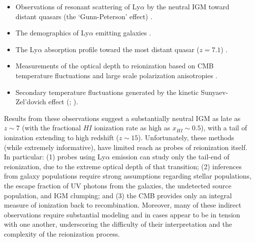 \documentclass[preprint]{aastex}
\newcommand{\Mycitealt}[1]{{\bf \citealt{#1}}}
\begin{document}
\begin{itemize}[noitemsep,nolistsep]

\item Observations of resonant scattering of Ly$\alpha$ by the neutral IGM toward
distant quasars (the `Gunn-Peterson' effect) \citep{fan_et_al2006}.

\item The demographics of Ly$\alpha$ emitting  galaxies \citep{schenker_et_al2013, treu_et_al2013,Faisst_et_al2014}.

\item The Ly$\alpha$ absorption profile toward the most distant quasar ($z = 7.1$) \citep{bolton_et_al2011}.

\item Measurements of the optical depth to reionization based on CMB temperature fluctuations \citep{planck_et_al2013}
and large scale polarization anisotropies \citep{page_et_al2007}.

\item Secondary temperature fluctuations generated by the kinetic Sunyaev-Zel'dovich effect (\citealt{zahn_et_al2012}; \Mycitealt{mesinger_et_al2012}). 

\end{itemize}
\noindent
Results from these observations suggest a substantially neutral IGM as late as $z \sim 7$ (with the fractional $HI$ ionization rate as high as $x_{HI} \sim 0.5$), with a tail of ionization extending to high 
redshift ($z \sim 15$).  Unfortunately, these methods (while extremely informative), have limited 
reach as probes of reionization itself. In particular:
(1) probes using Ly$\alpha$ emission can study only the tail-end of reionization, 
due to the extreme optical depth of that transition; (2) inferences from galaxy populations require strong assumptions 
regarding stellar populations, the escape fraction of UV photons from the galaxies, the undetected source population, 
and IGM clumping; and (3) the CMB provides only an integral measure of ionization back to recombination. 
Moreover, many of these indirect observations require substantial modeling and in cases appear to be
in tension with one another, underscoring the difficulty of
their interpretation and the complexity of the reionization process.
\end{document}

